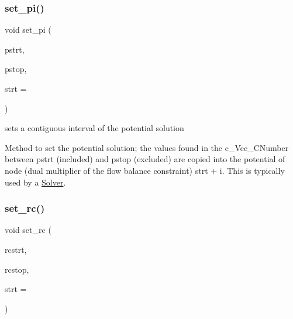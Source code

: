 \subsubsection{\texorpdfstring{set\+\_\+pi()}{set\_pi()}}
{\footnotesize\ttfamily void set\+\_\+pi (\begin{DoxyParamCaption}\item[{\mbox{\hyperlink{class_s_m_spp__di__unipi__it_1_1_m_c_f_block_aa2211b659beb942cfb7618c11033831e}{c\+\_\+\+Vec\+\_\+\+C\+Number\+\_\+it}}}]{pstrt,  }\item[{\mbox{\hyperlink{class_s_m_spp__di__unipi__it_1_1_m_c_f_block_aa2211b659beb942cfb7618c11033831e}{c\+\_\+\+Vec\+\_\+\+C\+Number\+\_\+it}}}]{pstop,  }\item[{\mbox{\hyperlink{class_s_m_spp__di__unipi__it_1_1_m_c_f_block_aee6156e2ce80720d57a082d80f39d8cc}{c\+\_\+\+Index}}}]{strt = {} }\end{DoxyParamCaption})\hspace{0.3cm}{\ttfamily [inline]}}



sets a contiguous interval of the potential solution 

Method to set the potential solution; the values found in the c\+\_\+\+Vec\+\_\+\+C\+Number between pstrt (included) and pstop (excluded) are copied into the potential of node (dual multiplier of the flow balance constraint) strt + i. This is typically used by a \mbox{\hyperlink{class_s_m_spp__di__unipi__it_1_1_solver}{Solver}}. \mbox{\label{class_s_m_spp__di__unipi__it_1_1_m_c_f_block_ace95d7a2ee61c1dfadb7f2ac02c99a81}} 
\subsubsection{\texorpdfstring{set\+\_\+rc()}{set\_rc()}}
{\footnotesize\ttfamily void set\+\_\+rc (\begin{DoxyParamCaption}\item[{\mbox{\hyperlink{class_s_m_spp__di__unipi__it_1_1_m_c_f_block_aa2211b659beb942cfb7618c11033831e}{c\+\_\+\+Vec\+\_\+\+C\+Number\+\_\+it}}}]{rcstrt,  }\item[{\mbox{\hyperlink{class_s_m_spp__di__unipi__it_1_1_m_c_f_block_aa2211b659beb942cfb7618c11033831e}{c\+\_\+\+Vec\+\_\+\+C\+Number\+\_\+it}}}]{rcstop,  }\item[{\mbox{\hyperlink{class_s_m_spp__di__unipi__it_1_1_m_c_f_block_aee6156e2ce80720d57a082d80f39d8cc}{c\+\_\+\+Index}}}]{strt = {} }\end{DoxyParamCaption})\hspace{0.3cm}{\ttfamily [inline]}}



